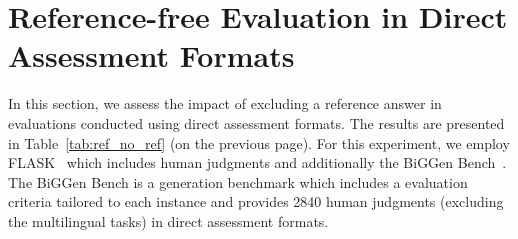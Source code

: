 \documentclass[11pt]{article}
\begin{document}
\clearpage



\section{Reference-free Evaluation in Direct Assessment Formats}\label{appendix:reference_free}

In this section, we assess the impact of excluding a reference answer in evaluations conducted using direct assessment formats. The results are presented in Table~\ref{tab:ref_no_ref} (on the previous page). For this experiment, we employ FLASK~\citep{ye2023flask} which includes human judgments and additionally the BiGGen Bench~\citep{kim2024biggen}. The BiGGen Bench is a generation benchmark which includes a evaluation criteria tailored to each instance and provides 2840 human judgments (excluding the multilingual tasks) in direct assessment formats.
\end{document}
